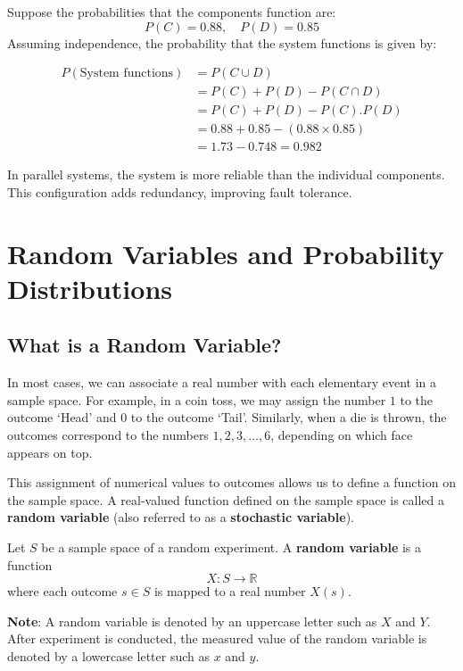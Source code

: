 \documentclass[twoside]{book}
\begin{document}
\begin{enumerate}
\begin{center}
\end{center}

Suppose the probabilities that the components function are:
\[
P(C) = 0.88, \quad P(D) = 0.85
\]
Assuming independence, the probability that the system functions is given by:

\[
\begin{aligned}
P(\text{System functions}) &= P(C \cup D) \\
&= P(C) + P(D) - P(C \cap D) \\
&= P(C) + P(D) - P(C).P(D) \\
&= 0.88 + 0.85 - (0.88 \times 0.85) \\
&= 1.73 - 0.748 = 0.982
\end{aligned}
\]

In parallel systems, the system is more reliable than the individual components. This configuration adds redundancy, improving fault tolerance.
\end{enumerate}

\chapter{Random Variables and Probability Distributions}
\section{What is a Random Variable?}
In most cases, we can associate a real number with each elementary event in a sample space. For example, in a coin toss, we may assign the number \(1\) to the outcome `Head' and \(0\) to the outcome `Tail'. Similarly, when a die is thrown, the outcomes correspond to the numbers \(1, 2, 3, \dots, 6\), depending on which face appears on top.

This assignment of numerical values to outcomes allows us to define a function on the sample space. A real-valued function defined on the sample space is called a \textbf{random variable} (also referred to as a \textbf{stochastic variable}).

\begin{textbox}
    Let \( S \) be a sample space of a random experiment. A \textbf{random variable} is a function
\[
X : S \rightarrow \mathbb{R}
\]
where each outcome \( s \in S \) is mapped to a real number \( X(s) \).

\end{textbox}
\textbf{Note}: A random variable is denoted by an uppercase letter such as $X$ and $Y$. After experiment is conducted, the measured value of the random variable is denoted by a lowercase letter such as $x$
and $y$.
\end{document}

